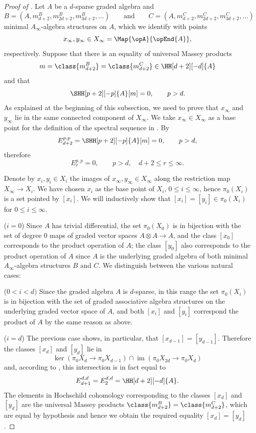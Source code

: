 \documentclass[a4paper]{amsart}
\begin{document}
\begin{proof}[Proof of ] Let $A$ be a $d$-sparse
  graded algebra and
  \[
    B=(A,m_{d+2}^B,m_{2d+2}^B,m_{3d+2}^B,\dots)\qquad\text{and}\qquad C=(A,m_{d+2}^C,m_{2d+2}^C,m_{3d+2}^C,\dots)
  \]
  minimal $A_\infty$-algebra structures on $A$, which we identify with points
  \[
    x_{\infty},y_\infty\in X_{\infty}=\Map{\opA}{\opEnd{A}},
  \]
  respectively. Suppose that there is an equality of universal Massey products
  \[
    m=\class{m_{d+2}^B}=\class{m_{d+2}^C}\in\HH[d+2][-d]{A}
  \]
  and that
  \[
    \SHH[p+2][-p]{A}[m]=0,\qquad p>d.
  \]
  As explained at the beginning of this subsection, we need to prove that $x_\infty$ and $y_{\infty}$ lie in
  the same connected component of $X_\infty$. We take $x_\infty\in X_\infty$ as a base point for the definition of the spectral sequence in \cite{Mur20b}. By 
  \[
    E^{p,p}_{d+2}=\SHH[p+2][-p]{A}[m]=0,\qquad p>d,
  \]
  therefore 
  \[E^{p,p}_{r}=0,\qquad p>d,\quad d+2\leq r\leq\infty.\]
  
  Denote by $x_i, y_i\in X_i$ the images of $x_\infty,y_\infty\in X_\infty$ along the restriction map $X_\infty\to X_i$. We have chosen $x_i$ as the base point of $X_i$, $0\leq i\leq\infty$, hence $\pi_0(X_i)$ is a set pointed by $[x_i]$. We will inductively show that $[x_i]=[y_i]\in\pi_0(X_i)$ for $0\leq i\leq \infty$.

  
($i=0$) Since $A$ has trivial differential, the set $\pi_0(X_0)$ is in
      bijection with the set of degree $0$ maps of graded vector spaces
      $A\otimes A\to A$, and the class $[x_0]$ corresponds to the product
      operation of
      $A$; the class $[y_0]$ also corresponds to the product operation of $A$
      since $A$ is the underlying graded algebra of both minimal
      $A_\infty$-algebra structures $B$ and $C$. We distinguish between the
      various natural cases:

      ($0<i<d)$ Since the graded algebra $A$ is $d$-sparse, in this range the
      set $\pi_0(X_i)$ is in bijection with the set of graded associative algebra structures on the underlying graded vector space of $A$, and both $[x_i]$ and $[y_i]$ correspond the product of $A$ by the same reason as above. 

      ($i=d$) The previous case shows, in particular, that
      $[x_{d-1}]=[y_{d-1}]$. Therefore the classes $[x_d]$ and $[y_d]$ lie in 
    \[\ker(\pi_0 X_d\to \pi_0 X_{d-1})\cap\operatorname{im}(\pi_0
      X_{2d}\to\pi_0 X_d)\]
    and, according to \cite[Eqn.~4.8]{Mur20b}, this intersection is in fact equal to
    \[
      E^{d,d}_{d+1}=E^{d,d}_{2}=\HH[d+2][-d]{A}.
    \]
    The elements in Hochschild cohomology corresponding to the classes $[x_d]$
    and $[y_d]$ are the universal Massey products
    $\class{m_{d+2}^B}=\class{m_{d+2}^C}$, which are equal by hypothesis and
    hence we obtain the required equality $[x_d]=[y_d]$.


\end{proof}
\end{document}
